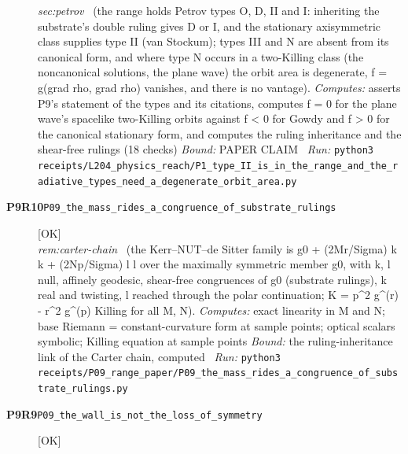\begin{description}
\textit{sec:petrov} \ (the range holds Petrov types O, D, II and I: inheriting the substrate's double ruling gives D or I, and the stationary axisymmetric class supplies type II (van Stockum); types III and N are absent from its canonical form, and where type N occurs in a two-Killing class (the noncanonical solutions, the plane wave) the orbit area is degenerate, f = g(grad rho, grad rho) vanishes, and there is no vantage). 
\emph{Computes:} asserts P9's statement of the types and its citations, computes f = 0 for the plane wave's spacelike two-Killing orbits against f < 0 for Gowdy and f > 0 for the canonical stationary form, and computes the ruling inheritance and the shear-free rulings (18 checks)
 \emph{Bound:} PAPER CLAIM
\ \emph{Run:} \texttt{python3 receipts/L204\_physics\_reach/P1\_type\_II\_is\_in\_the\_range\_and\_the\_radiative\_types\_need\_a\_degenerate\_orbit\_area.py}
\item[\rcptlabel{P09_the_mass_rides_a_congruence_of_substrate_rulings}{P9R10}\textbf{P9R10}\quad\texttt{P09\_the\_mass\_rides\_a\_congruence\_of\_substrate\_rulings}]\hfill\textsf{[OK]}\\
\textit{rem:carter-chain} \ (the Kerr--NUT--de Sitter family is g0 + (2Mr/Sigma) k k + (2Np/Sigma) l l over the maximally symmetric member g0, with k, l null, affinely geodesic, shear-free congruences of g0 (substrate rulings), k real and twisting, l reached through the polar continuation; K = p\textasciicircum{}2 g\textasciicircum{}(r) - r\textasciicircum{}2 g\textasciicircum{}(p) Killing for all M, N). 
\emph{Computes:} exact linearity in M and N; base Riemann = constant-curvature form at sample points; optical scalars symbolic; Killing equation at sample points
 \emph{Bound:} the ruling-inheritance link of the Carter chain, computed
\ \emph{Run:} \texttt{python3 receipts/P09\_range\_paper/P09\_the\_mass\_rides\_a\_congruence\_of\_substrate\_rulings.py}
\item[\rcptlabel{P09_the_wall_is_not_the_loss_of_symmetry}{P9R9}\textbf{P9R9}\quad\texttt{P09\_the\_wall\_is\_not\_the\_loss\_of\_symmetry}]\hfill\textsf{[OK]}\\

\end{description}
